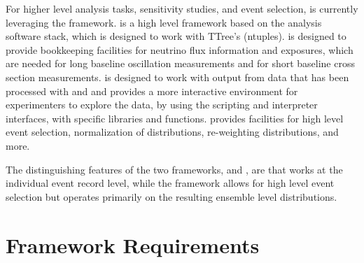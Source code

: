 \documentclass[../main-v1.tex]{subfiles}
\begin{document}
For higher level analysis tasks, sensitivity studies, and event selection,  is currently leveraging the 
framework.   is a high level framework based on the  analysis software stack, which is designed to work with  TTree's (ntuples).   is designed to provide bookkeeping facilities for neutrino flux information and exposures, which are needed for long baseline oscillation measurements and for short baseline cross section measurements.   is designed to work with output from data that has been processed with  and  and provides a more interactive environment for experimenters to explore the data, by using the  scripting and interpreter interfaces, with specific  libraries and functions.   provides facilities for high level event selection, normalization of distributions, re-weighting distributions,  and more.

The distinguishing features of the two frameworks,  and , are that  works at the individual event record level, while the  framework allows for high level event selection but operates primarily on the resulting ensemble level distributions.  

\section{Framework Requirements }


\end{document}
